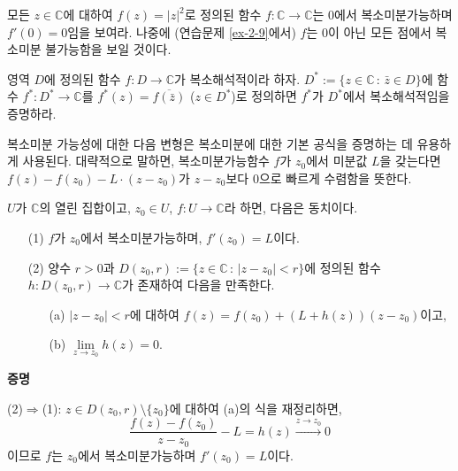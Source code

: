 \begin{salt_exercise} \label{ex-2-1}
모든 $z\in\mathbb C$에 대하여 $f(z) = |z|^2$로 정의된
함수 $f:\mathbb C \to \mathbb C$는 $0$에서 복소미분가능하며
$f'(0)=0$임을 보여라.
나중에 (연습문제 \ref{ex-2-9}에서) $f$는 $0$이 아닌 모든 점에서 복소미분 불가능함을 보일 것이다.
\end{salt_exercise}

\begin{salt_exercise} \label{ex-2-2}
영역 $D$에 정의된 함수 $f:D\to \mathbb C$가 복소해석적이라 하자.
$D^* := \{ z\in \mathbb C \,:\, \bar z \in D\}$에 
함수 $f^*:D^* \to \mathbb C$를 $f^*(z) = \overline{f(\bar  z)}$ ($z\in D^*$)로
정의하면 $f^*$가  $D^*$에서 복소해석적임을 증명하라.
\end{salt_exercise}

복소미분 가능성에 대한 다음 변형은 복소미분에 대한 기본 공식을 증명하는 데 유용하게 사용된다.
대략적으로 말하면, 복소미분가능함수 $f$가 $z_0$에서 미분값 $L$을 갖는다면
$f(z)-f(z_0) - L\cdot (z-z_0)$가 $z-z_0$보다 $0$으로 빠르게 수렴함을 뜻한다.

\begin{salt_lemma} \label{lemma-2-1}
$U$가 $\mathbb C$의 열린 집합이고, $z_0\in U$, $f:U\to\mathbb C$라 하면,
다음은 동치이다.
\begin{itemize}
\item[(1)] $f$가 $z_0$에서 복소미분가능하며, $f'(z_0)=L$이다.
\item[(2)] 양수 $r>0$과  $D(z_0,r):=\{z\in\mathbb C\,:\, |z-z_0|<r\}$에 정의된
함수  $h:D(z_0,r)\to \mathbb C$가 존재하여 다음을 만족한다.
\begin{itemize}
\item[(a)] $|z-z_0|<r$에 대하여 $f(z)=f(z_0) + (L+h(z))(z-z_0)$이고,
\item[(b)] $\lim\limits_{z\to z_0} h(z)=0$.
\end{itemize}
\end{itemize}
\end{salt_lemma}

{\bf 증명}

(2)$\Rightarrow$(1):
$z\in D(z_0,r)\setminus \{z_0\}$에 대하여 (a)의 식을 재정리하면,
\[
\dfrac{f(z) - f(z_0)}{z - z_0} - L = h(z) \stackrel{z\to z_0}{\longrightarrow} 0
\]
이므로 $f$는 $z_0$에서 복소미분가능하며 $f'(z_0)=L$이다.

